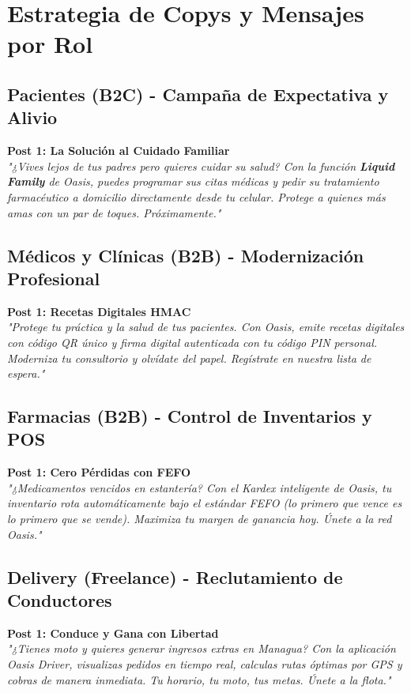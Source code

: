 \documentclass[11pt,a4paper]{article}
\begin{document}
\section{Estrategia de Copys y Mensajes por Rol}

\subsection{Pacientes (B2C) - Campaña de Expectativa y Alivio}
\textbf{Post 1: La Solución al Cuidado Familiar}\\
\textit{"¿Vives lejos de tus padres pero quieres cuidar su salud? Con la función \textbf{Liquid Family} de Oasis, puedes programar sus citas médicas y pedir su tratamiento farmacéutico a domicilio directamente desde tu celular. Protege a quienes más amas con un par de toques. Próximamente."}

\subsection{Médicos y Clínicas (B2B) - Modernización Profesional}
\textbf{Post 1: Recetas Digitales HMAC}\\
\textit{"Protege tu práctica y la salud de tus pacientes. Con Oasis, emite recetas digitales con código QR único y firma digital autenticada con tu código PIN personal. Moderniza tu consultorio y olvídate del papel. Regístrate en nuestra lista de espera."}

\subsection{Farmacias (B2B) - Control de Inventarios y POS}
\textbf{Post 1: Cero Pérdidas con FEFO}\\
\textit{"¿Medicamentos vencidos en estantería? Con el Kardex inteligente de Oasis, tu inventario rota automáticamente bajo el estándar FEFO (lo primero que vence es lo primero que se vende). Maximiza tu margen de ganancia hoy. Únete a la red Oasis."}

\subsection{Delivery (Freelance) - Reclutamiento de Conductores}
\textbf{Post 1: Conduce y Gana con Libertad}\\
\textit{"¿Tienes moto y quieres generar ingresos extras en Managua? Con la aplicación Oasis Driver, visualizas pedidos en tiempo real, calculas rutas óptimas por GPS y cobras de manera inmediata. Tu horario, tu moto, tus metas. Únete a la flota."}
\end{document}
